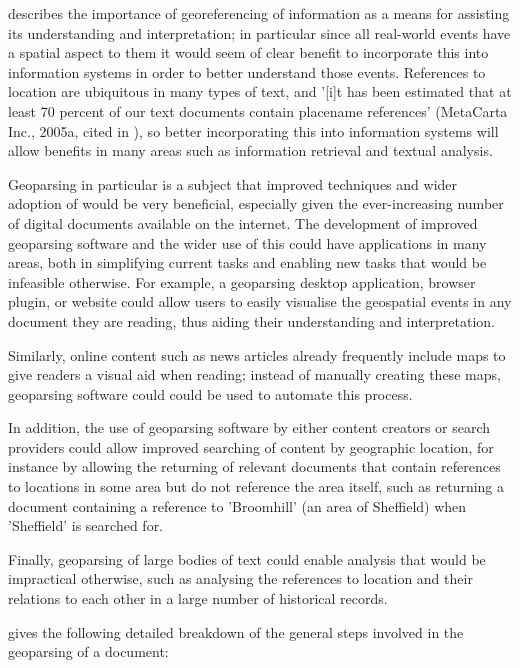 \documentclass[12pt, a4paper]{report}
\begin{document}
\citet{hill2006} describes the importance of georeferencing of information as a means for assisting its understanding and interpretation; in particular since all real-world events have a spatial aspect to them it would seem of clear benefit to incorporate this into information systems in order to better understand those events. References to location are ubiquitous in many types of text, and '[i]t has been estimated that at least 70 percent of our text documents contain placename references' (MetaCarta Inc., 2005a, cited in \citet[p.~5]{hill2006}), so better incorporating this into information systems will allow benefits in many areas such as information retrieval and textual analysis. %

Geoparsing in particular is a subject that improved techniques and wider adoption of would be very beneficial, especially given the ever-increasing number of digital documents available on the internet. The development of improved geoparsing software and the wider use of this could have applications in many areas, both in simplifying current tasks and enabling new tasks that would be infeasible otherwise. For example, a geoparsing desktop application, browser plugin, or website could allow users to easily visualise the geospatial events in any document they are reading, thus aiding their understanding and interpretation.

Similarly, online content such as news articles already frequently include maps to give readers a visual aid when reading; instead of manually creating these maps, geoparsing software could could be used to automate this process.

In addition, the use of geoparsing software by either content creators or search providers could allow improved searching of content by geographic location, for instance by allowing the returning of relevant documents that contain references to locations in some area but do not reference the area itself, such as returning a document containing a reference to 'Broomhill' (an area of Sheffield) when 'Sheffield' is searched for.

Finally, geoparsing of large bodies of text could enable analysis that would be impractical otherwise, such as analysing the references to location and their relations to each other in a large number of historical records.

\citet{hill2006} gives the following detailed breakdown of the general steps involved in the geoparsing of a document:
\end{document}
